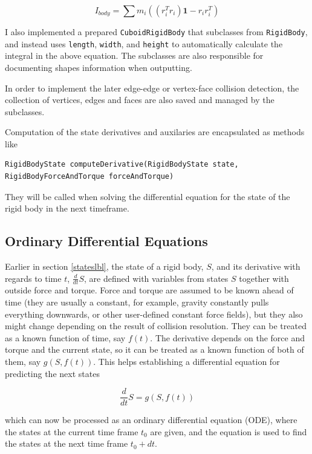 \documentclass[12pt,a4paper,twoside,openright]{report}
\newcommand{\code}{\texttt}
\begin{document}
\begin{equation}
I_{body} = \sum m_i((r_i^T r_i)\textbf{1} - r_i r_i^T)
\end{equation}

I also implemented a prepared \code{CuboidRigidBody} that subclasses from \code{RigidBody}, and instead uses \code{length}, \code{width}, and \code{height} to automatically calculate the integral in the above equation. The subclasses are also responsible for documenting shapes information when outputting.

In order to implement the later edge-edge or vertex-face collision detection, the collection of vertices, edges and faces are also saved and managed by the subclasses.

Computation of the state derivatives and auxilaries are encapsulated as methods like 

\begin{verbatim}
RigidBodyState computeDerivative(RigidBodyState state, 
RigidBodyForceAndTorque forceAndTorque)
\end{verbatim}

They will be called when solving the differential equation for the state of the rigid body in the next timeframe.

\subsection{Ordinary Differential Equations}\label{odelbl}\label{im3}

Earlier in section \ref{stateslbl}, the state of a rigid body, $S$, and its derivative with regards to time $t$, $\frac{d}{dt}S$, are defined with variables from states $S$ together with outside force and torque. Force and torque are assumed to be known ahead of time (they are usually a constant, for example, gravity constantly pulls everything downwards, or other user-defined constant force fields), but they also might change depending on the result of collision resolution. They can be treated as a known function of time, say $f(t)$. The derivative depends on the force and torque and the current state, so it can be treated as a known function of both of them, say $g(S, f(t))$. This helps establishing a differential equation for predicting the next states

\begin{equation}
\frac{d}{dt}S = g(S, f(t))
\end{equation}

which can now be processed as an ordinary differential equation (ODE), where the states at the current time frame $t_0$ are given, and the equation is used to find the states at the next time frame $t_0 + dt$.
\end{document}
